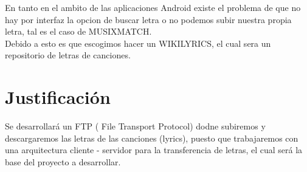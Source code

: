 \documentclass[12pt,A4]{article}
\begin{document}
En tanto en el ambito de las aplicaciones Android existe el problema de que no hay por interfaz la opcion de buscar letra o no podemos subir nuestra propia letra, tal es el caso de MUSIXMATCH.\\

Debido a esto es que escogimos hacer un WIKILYRICS, el cual sera un repositorio de letras de canciones.

\section*{\centering Justificación}
Se desarrollará un FTP ( File Transport Protocol) dodne subiremos y descargaremos las letras de las canciones (lyrics), puesto que trabajaremos con una arquitectura cliente - servidor para la transferencia de letras, el cual será la base del proyecto a desarrollar.
\end{document}
